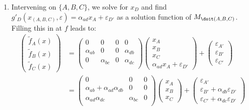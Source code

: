 \begin{enumerate}
\begin{gradedsolution}
\begin{enumerate}
      \item {} Intervening on $\{A,B,C\}$, we solve for $x_D$ and find $g'_D(x_{(A, B, C)}, \varepsilon)=\alpha_{ad} x_A + \varepsilon_{D'}$ as a solution function of $M_{\doit(A, B, C)}$. Filling this in at $f$ leads to:
      \begin{align*}
        \begin{pmatrix}
          \tilde{f}_A(x) \\ \tilde{f}_B(x) \\ \tilde{f}_C(x)
        \end{pmatrix}
         & =
        \begin{pmatrix}
          0           & 0           & 0 & 0           \\
          \alpha_{ab} & 0           & 0 & \alpha_{db} \\
          0           & \alpha_{bc} & 0 & \alpha_{dc} \\
        \end{pmatrix}
        \begin{pmatrix}
          x_A \\ x_B \\ x_C \\ \alpha_{ad} x_A + \varepsilon_{D'}
        \end{pmatrix}
        +
        \begin{pmatrix}
          \varepsilon_{A'} \\ \varepsilon_{B'} \\ \varepsilon_{C'}
        \end{pmatrix} \\
         & =
        \begin{pmatrix}
          0                                  & 0           & 0 \\
          \alpha_{ab}+\alpha_{ad}\alpha_{db} & 0           & 0 \\
          \alpha_{ad}\alpha_{dc}             & \alpha_{bc} & 0 \\
        \end{pmatrix}
        \begin{pmatrix}
          x_A \\ x_B \\ x_C
        \end{pmatrix}
        +
        \begin{pmatrix}
          \varepsilon_{A'} \\ \varepsilon_{B'} +\alpha_{db}\varepsilon_{D'}\\ \varepsilon_{C'} + \alpha_{dc}\varepsilon_{D'}

\end{pmatrix}
\end{align*}
\end{enumerate}
\end{gradedsolution}
\end{enumerate}
